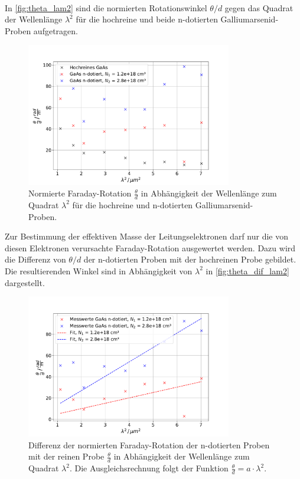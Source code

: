 \\
In \autoref{fig:theta_lam2} sind die normierten Rotationswinkel $\theta / d$ gegen das Quadrat der Wellenlänge $\lambda^2$ für die hochreine und beide n-dotierten Galliumarsenid-Proben aufgetragen.
\begin{figure}
    \centering
    \includegraphics[width=0.8\textwidth]{figure/theta_lam2.pdf}
    \caption{Normierte Faraday-Rotation $\frac{\theta}{d}$ in Abhängigkeit der Wellenlänge zum Quadrat $\lambda^2$ für die hochreine und n-dotierten Galliumarsenid-Proben.}
    \label{fig:theta_lam2}
\end{figure}
Zur Bestimmung der effektiven Masse der Leitungselektronen darf nur die von diesen Elektronen verursachte Faraday-Rotation ausgewertet werden.
Dazu wird die Differenz von $\theta / d$ der n-dotierten Proben mit der hochreinen Probe gebildet.
Die resultierenden Winkel sind in Abhängigkeit von $\lambda^2$ in \autoref{fig:theta_dif_lam2} dargestellt.
\begin{figure}
    \centering
    \includegraphics[width=0.8\textwidth]{figure/theta_lam2_dif.pdf}
    \caption{Differenz der normierten Faraday-Rotation der n-dotierten Proben mit der reinen Probe $\frac{\theta}{d}$ in Abhängigkeit der Wellenlänge zum Quadrat $\lambda^2$.
    Die Ausgleichsrechnung folgt der Funktion $\frac{\theta}{d} = a\cdot \lambda^2$.
    }
    \label{fig:theta_dif_lam2}
\end{figure}
